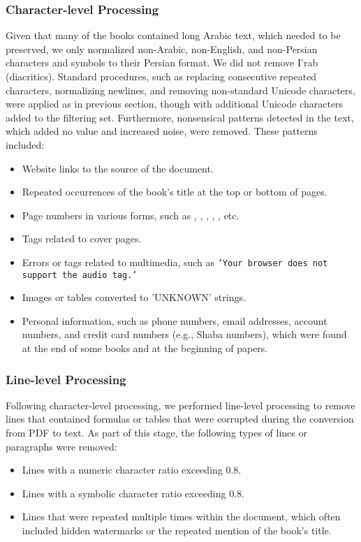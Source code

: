 \subsubsection{Character-level Processing}
Given that many of the books contained long Arabic text, which needed to be preserved, we only normalized non-Arabic, non-English, and non-Persian characters and symbols to their Persian format. We did not remove I'rab (diacritics). Standard procedures, such as replacing consecutive repeated characters, normalizing newlines, and removing non-standard Unicode characters, were applied as in previous section, though with additional Unicode characters added to the filtering set. Furthermore, nonsensical patterns detected in the text, which added no value and increased noise, were removed. These patterns included: 
\begin{itemize} 
    \item Website links to the source of the document. 
    \item Repeated occurrences of the book's title at the top or bottom of pages. 
    \item Page numbers in various forms, such as , , , , , etc. 
    \item Tags related to cover pages. \item Errors or tags related to multimedia, such as \texttt{'Your browser does not support the audio tag.'} 
    \item Images or tables converted to 'UNKNOWN' strings. 
    \item Personal information, such as phone numbers, email addresses, account numbers, and credit card numbers (e.g., Shaba numbers), which were found at the end of some books and at the beginning of papers. 
\end{itemize}

\subsubsection{Line-level Processing}
Following character-level processing, we performed line-level processing to remove lines that contained formulas or tables that were corrupted during the conversion from PDF to text. As part of this stage, the following types of lines or paragraphs were removed: 
\begin{itemize} 
    \item Lines with a numeric character ratio exceeding 0.8. 
    \item Lines with a symbolic character ratio exceeding 0.8. 
    \item Lines that were repeated multiple times within the document, which often included hidden watermarks or the repeated mention of the book's title. 
\end{itemize}

